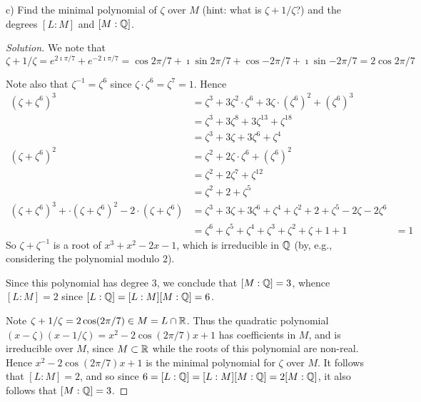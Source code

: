 \begin{que}
c) Find the minimal polynomial of $\zeta$ over $M$ (hint: what is $\zeta + 1 / \zeta$?) and the degrees $[L:M]$ and $[M:\mathbb{Q}]$.
\begin{proof}[Solution]
We note that \[\zeta + 1/\zeta = e^{2\imath\pi/7} + e^{-2\imath\pi/7} = \cos{2\pi/7} + \imath\sin{2\pi/7} + \cos{-2\pi/7} + \imath\sin{-2\pi/7} = 2\cos{2\pi/7}\]

Note also that $\zeta^{-1} = \zeta^6$ since $\zeta \cdot \zeta^6 = \zeta^7 = 1$. Hence
\begin{align*}
(\zeta + \zeta^6)^3 &= \zeta^3 + 3 \zeta^2 \cdot \zeta^6 + 3 \zeta \cdot (\zeta^6)^2 + (\zeta^6)^3\\
                    &= \zeta^3 + 3 \zeta^8 + 3 \zeta^{13} + \zeta^{18}\\
                    &= \zeta^3 + 3 \zeta + 3 \zeta^6 + \zeta^4\\
(\zeta + \zeta^6)^2 &= \zeta^2 + 2 \zeta \cdot \zeta^6 + (\zeta^6)^2\\
                    &= \zeta^2 + 2 \zeta^7 + \zeta^{12}\\
                    &= \zeta^2 + 2 + \zeta^5\\
(\zeta + \zeta^6)^3 + \cdot (\zeta + \zeta^6)^2 - 2 \cdot (\zeta + \zeta^6)
                    &= \zeta^3 + 3 \zeta + 3 \zeta^6 + \zeta^4
                     + \zeta^2 + 2 + \zeta^5
                     - 2 \zeta - 2 \zeta^6\\
                    &= \zeta^6 + \zeta^5 + \zeta^4 + \zeta^3 + \zeta^2 + \zeta + 1 + 1
                    &= 1
\end{align*}
So $\zeta + \zeta^{-1}$ is a root of $x^3 + x^2 - 2x - 1$, which is irreducible in $\mathbb{Q}$ (by, e.g., considering the polynomial modulo $2$).

Since this polynomial has degree $3$, we conclude that $[M : \mathbb{Q}] = 3$, whence $[L : M] = 2$ since $[L : \mathbb{Q}] = [L : M] [M : \mathbb{Q}] = 6$.

{\color{blue}Note $\zeta + 1/\zeta = 2\cos(2\pi/7) \in M = L \cap \mathbb{R}$. Thus the quadratic polynomial $(x - \zeta)(x - 1/\zeta) = x^2 - 2\cos(2\pi/7)x + 1$ has coefficients in $M$, and is irreducible over $M$, since $M \subset \mathbb{R}$ while the roots of this polynomial are non-real. Hence $x^2 - 2\cos(2\pi /7)x + 1$ is the minimal polynomial for $\zeta$ over $M$. It follows that $[L:M] = 2$, and so since $6 = [L:\mathbb{Q}] = [L:M][M:\mathbb{Q}] = 2 [M:\mathbb{Q}]$, it also follows that $[M:\mathbb{Q}] = 3$.}
\end{proof}
\end{que}

